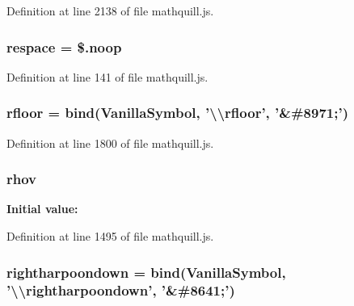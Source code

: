 Definition at line 2138 of file mathquill.\-js.

\subsubsection[{respace}]{\setlength{\rightskip}{0pt plus 5cm}{\bf \-\_\-} respace = \$.noop}\label{mathquill_8js_a0d6683f95d11ddfc78f33bdc01ed7b05}


Definition at line 141 of file mathquill.\-js.

\subsubsection[{rfloor}]{ rfloor = {\bf bind}({\bf Vanilla\-Symbol}, '\textbackslash{}\textbackslash{}rfloor', '\&\#8971;')}\label{mathquill_8js_a43ddcaa76aa5c31d3969b1c55495e384}


Definition at line 1800 of file mathquill.\-js.

\subsubsection[{rhov}]{ rhov}\label{mathquill_8js_a73c444c1d2fb4e5aed970cb60a07a459}
{\bfseries Initial value\-:}


Definition at line 1495 of file mathquill.\-js.

\subsubsection[{rightharpoondown}]{ rightharpoondown = {\bf bind}({\bf Vanilla\-Symbol}, '\textbackslash{}\textbackslash{}rightharpoondown', '\&\#8641;')}\label{mathquill_8js_a018a4173820b9573761c4ce38ba308da}


